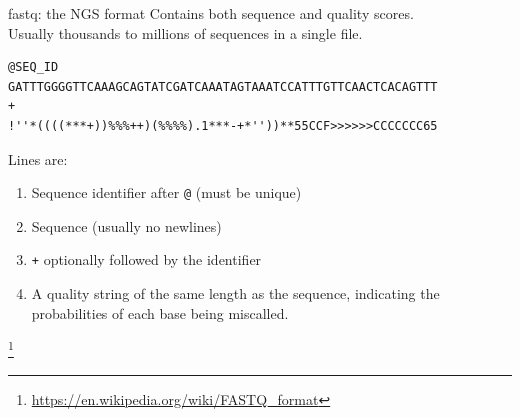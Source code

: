 \documentclass[pdf]{beamer}
\newcommand\blfootnote[1]{%
  \begingroup  %
  \renewcommand\thefootnote{}\footnote{#1}%
  \addtocounter{footnote}{-1}  %
  \endgroup
}
\begin{document}
\begin{frame}[fragile]{fastq: the NGS format}
  Contains both sequence and quality scores.\\
  Usually thousands to millions of sequences in a single file.
  {\footnotesize
  \begin{verbatim}
@SEQ_ID
GATTTGGGGTTCAAAGCAGTATCGATCAAATAGTAAATCCATTTGTTCAACTCACAGTTT
+
!''*((((***+))%%%++)(%%%%).1***-+*''))**55CCF>>>>>>CCCCCCC65
  \end{verbatim}
    }
  Lines are:
  \begin{enumerate}
    \item Sequence identifier after \verb|@| (must be unique)
    \item Sequence (usually no newlines)
    \item \verb|+| optionally followed by the identifier
    \item A quality string of the same length as the sequence, indicating the
      probabilities of each base being miscalled.
  \end{enumerate}
  \blfootnote{\url{https://en.wikipedia.org/wiki/FASTQ_format}}
\end{frame}
\end{document}
